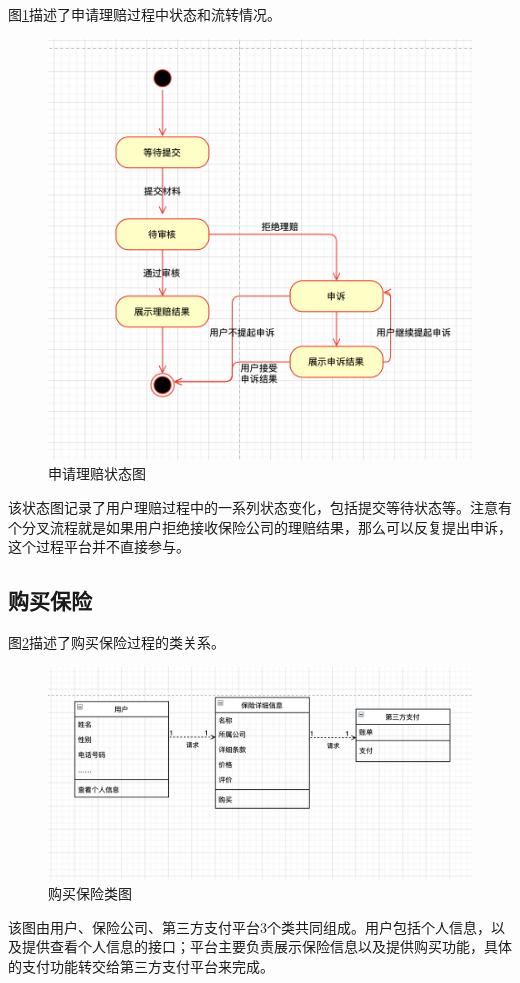 \documentclass[a4paper]{ctexart}
\begin{document}
图\ref{fig:申请理赔状态图}描述了申请理赔过程中状态和流转情况。
\begin{figure}[H]
\centering
\includegraphics[scale=0.3]{image/1_8状态图.png}
\caption{申请理赔状态图}
\label{fig:申请理赔状态图}
\end{figure}
该状态图记录了用户理赔过程中的一系列状态变化，包括提交等待状态等。注意有个分叉流程就是如果用户拒绝接收保险公司的理赔结果，那么可以反复提出申诉，这个过程平台并不直接参与。
\subsection{购买保险}
图\ref{fig:购买保险类图}描述了购买保险过程的类关系。
\begin{figure}[H]
\centering
\includegraphics[scale=0.5]{image/1_5类图.png}
\caption{购买保险类图}
\label{fig:购买保险类图}
\end{figure}
该图由用户、保险公司、第三方支付平台3个类共同组成。用户包括个人信息，以及提供查看个人信息的接口；平台主要负责展示保险信息以及提供购买功能，具体的支付功能转交给第三方支付平台来完成。\\
\end{document}
